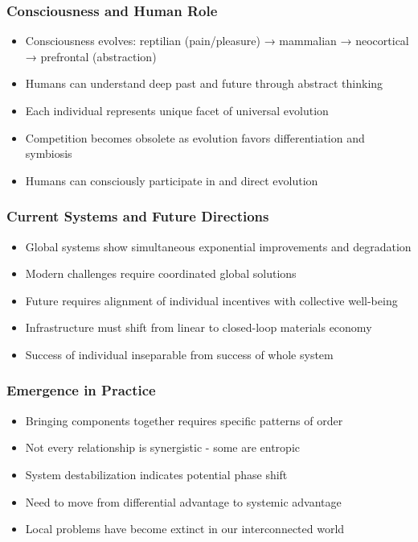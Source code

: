 \begin{frame}[fragile]\frametitle{Consciousness and Human Role}
	\begin{itemize}
	\item Consciousness evolves: reptilian (pain/pleasure) → mammalian → neocortical → prefrontal (abstraction)
	\item Humans can understand deep past and future through abstract thinking
	\item Each individual represents unique facet of universal evolution
	\item Competition becomes obsolete as evolution favors differentiation and symbiosis
	\item Humans can consciously participate in and direct evolution
	\end{itemize}
\end{frame}

\begin{frame}[fragile]\frametitle{Current Systems and Future Directions}
	\begin{itemize}
	\item Global systems show simultaneous exponential improvements and degradation
	\item Modern challenges require coordinated global solutions
	\item Future requires alignment of individual incentives with collective well-being
	\item Infrastructure must shift from linear to closed-loop materials economy
	\item Success of individual inseparable from success of whole system
	\end{itemize}
\end{frame}

\begin{frame}[fragile]\frametitle{Emergence in Practice}
	\begin{itemize}
	\item Bringing components together requires specific patterns of order
	\item Not every relationship is synergistic - some are entropic
	\item System destabilization indicates potential phase shift
	\item Need to move from differential advantage to systemic advantage
	\item Local problems have become extinct in our interconnected world
	\end{itemize}
\end{frame}